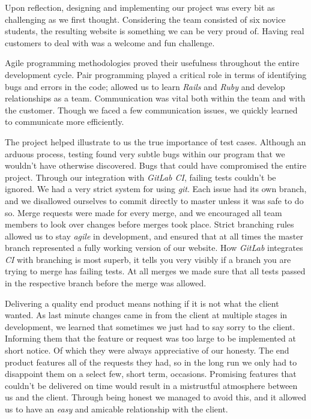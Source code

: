 \documentclass{l3proj}
\begin{document}
Upon reflection, designing and implementing our project was every bit as challenging as we first thought. Considering the team consisted of six novice students, the resulting website is something we can be very proud of. Having real customers to deal with was a welcome and fun challenge.

Agile programming methodologies proved their usefulness throughout the entire development cycle. Pair programming played a critical role in terms of identifying bugs and errors in the code; allowed us to learn \textit{Rails} and \textit{Ruby} and develop relationships as a team. Communication was vital both within the team and with the customer. Though we faced a few communication issues, we quickly learned to communicate more efficiently.


The project helped illustrate to us the true importance of test cases. Although an arduous process, testing found very subtle bugs within our program that we wouldn't have otherwise discovered. Bugs that could have compromised the entire project. Through our integration with \textit{GitLab CI}, failing tests couldn't be ignored. We had a very strict system for using \textit{git}. Each issue had its own branch, and we disallowed ourselves to commit directly to master unless it was safe to do so. Merge requests were made for every merge, and we encouraged all team members to look over changes before merges took place. Strict branching rules allowed us to stay \textit{agile} in development, and ensured that at all times the master branch represented a fully working version of our website. How \textit{GitLab} integrates \textit{CI} with branching is most superb, it tells you very visibly if a branch you are trying to merge has failing tests. At all merges we made sure that all tests passed in the respective branch before the merge was allowed.

Delivering a quality end product means nothing if it is not what the client wanted. As last minute changes came in from the client at multiple stages in development, we learned that sometimes we just had to say sorry to the client. Informing them that the feature or request was too large to be implemented at short notice. Of which they were always appreciative of our honesty. The end product features all of the requests they had, so in the long run we only had to disappoint them on a select few, short term, occasions. Promising features that couldn't be delivered on time would result in a mistrustful atmosphere between us and the client. Through being honest we managed to avoid this, and it allowed us to have an \textit{easy} and amicable relationship with the client.
\end{document}
